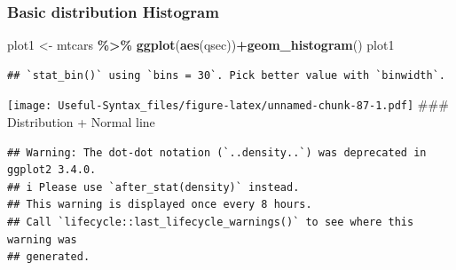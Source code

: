 \documentclass[
]{article}
\newenvironment{Shaded}{\begin{snugshade}}{\end{snugshade}}
\newcommand{\AttributeTok}[1]{\textcolor[rgb]{0.13,0.29,0.53}{#1}}
\newcommand{\CommentTok}[1]{\textcolor[rgb]{0.56,0.35,0.01}{\textit{#1}}}
\newcommand{\DecValTok}[1]{\textcolor[rgb]{0.00,0.00,0.81}{#1}}
\newcommand{\FunctionTok}[1]{\textcolor[rgb]{0.13,0.29,0.53}{\textbf{#1}}}
\newcommand{\NormalTok}[1]{#1}
\newcommand{\OtherTok}[1]{\textcolor[rgb]{0.56,0.35,0.01}{#1}}
\newcommand{\SpecialCharTok}[1]{\textcolor[rgb]{0.81,0.36,0.00}{\textbf{#1}}}
\begin{document}
\hypertarget{basic-distribution-histogram}{%
\subsubsection{Basic distribution Histogram}\label{basic-distribution-histogram}}

\begin{Shaded}
\begin{Highlighting}[]
\NormalTok{plot1 }\OtherTok{\textless{}{-}}\NormalTok{ mtcars }\SpecialCharTok{\%\textgreater{}\%} \FunctionTok{ggplot}\NormalTok{(}\FunctionTok{aes}\NormalTok{(qsec))}\SpecialCharTok{+}\FunctionTok{geom\_histogram}\NormalTok{()}
\NormalTok{plot1}
\end{Highlighting}
\end{Shaded}

\begin{verbatim}
## `stat_bin()` using `bins = 30`. Pick better value with `binwidth`.
\end{verbatim}

\texttt{[image: Useful-Syntax\_files/figure-latex/unnamed-chunk-87-1.pdf]}
\#\#\# Distribution + Normal line

\begin{Shaded}
\end{Shaded}

\begin{verbatim}
## Warning: The dot-dot notation (`..density..`) was deprecated in ggplot2 3.4.0.
## i Please use `after_stat(density)` instead.
## This warning is displayed once every 8 hours.
## Call `lifecycle::last_lifecycle_warnings()` to see where this warning was
## generated.
\end{verbatim}
\end{document}
